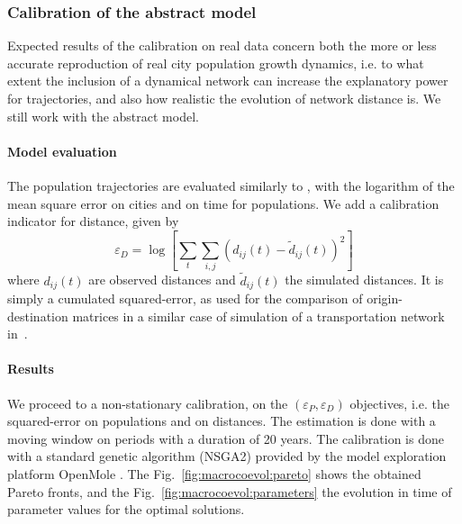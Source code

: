 \documentclass[11pt]{article}
\begin{document}
\subsubsection{Calibration of the abstract model}


Expected results of the calibration on real data concern both the more or less accurate reproduction of real city population growth dynamics, i.e. to what extent the inclusion of a dynamical network can increase the explanatory power for trajectories, and also how realistic the evolution of network distance is. We still work with the abstract model.


\paragraph{Model evaluation}


The population trajectories are evaluated similarly to \cite{raimbault2018indirect}, with the logarithm of the mean square error on cities and on time for populations. We add a calibration indicator for distance, given by
\[
\varepsilon_D = \log \left[ \sum_t \sum_{i,j} \left(d_{ij}(t) - \tilde{d}_{ij}(t)\right)^2\right]
\]
where $d_{ij}(t)$ are observed distances and $\tilde{d}_{ij}(t)$ the simulated distances. It is simply a cumulated squared-error, as used for the comparison of origin-destination matrices in a similar case of simulation of a transportation network in~\cite{jacobs2016transport}.



\paragraph{Results}

We proceed to a non-stationary calibration, on the $(\varepsilon_P,\varepsilon_D)$ objectives, i.e. the squared-error on populations and on distances. The estimation is done with a moving window on periods with a duration of 20 years. The calibration is done with a standard genetic algorithm (NSGA2) provided by the model exploration platform OpenMole \citep{reuillon2013openmole}. The Fig.~\ref{fig:macrocoevol:pareto} shows the obtained Pareto fronts, and the Fig.~\ref{fig:macrocoevol:parameters} the evolution in time of parameter values for the optimal solutions.
\end{document}
